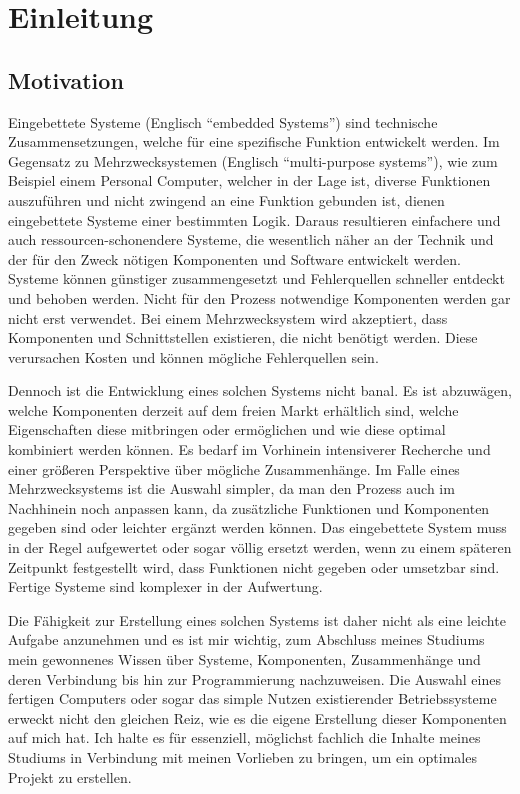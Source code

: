 \hypertarget{einleitung}{%
\chapter{Einleitung}\label{einleitung}}

\hypertarget{motivation}{%
\section{Motivation}\label{motivation}}

Eingebettete Systeme (Englisch ``embedded Systems'') sind technische
Zusammensetzungen, welche für eine spezifische Funktion entwickelt
werden. Im Gegensatz zu Mehrzwecksystemen (Englisch ``multi-purpose
systems''), wie zum Beispiel einem Personal Computer, welcher in der
Lage ist, diverse Funktionen auszuführen und nicht zwingend an eine
Funktion gebunden ist, dienen eingebettete Systeme einer bestimmten
Logik. Daraus resultieren einfachere und auch ressourcen-schonendere
Systeme, die wesentlich näher an der Technik und der für den Zweck
nötigen Komponenten und Software entwickelt werden. Systeme können
günstiger zusammengesetzt und Fehlerquellen schneller entdeckt und
behoben werden. Nicht für den Prozess notwendige Komponenten werden gar
nicht erst verwendet. Bei einem Mehrzwecksystem wird akzeptiert, dass
Komponenten und Schnittstellen existieren, die nicht benötigt werden.
Diese verursachen Kosten und können mögliche Fehlerquellen sein.

Dennoch ist die Entwicklung eines solchen Systems nicht banal. Es ist
abzuwägen, welche Komponenten derzeit auf dem freien Markt erhältlich
sind, welche Eigenschaften diese mitbringen oder ermöglichen und wie
diese optimal kombiniert werden können. Es bedarf im Vorhinein
intensiverer Recherche und einer größeren Perspektive über mögliche
Zusammenhänge. Im Falle eines Mehrzwecksystems ist die Auswahl simpler,
da man den Prozess auch im Nachhinein noch anpassen kann, da zusätzliche
Funktionen und Komponenten gegeben sind oder leichter ergänzt werden
können. Das eingebettete System muss in der Regel aufgewertet oder sogar
völlig ersetzt werden, wenn zu einem späteren Zeitpunkt festgestellt
wird, dass Funktionen nicht gegeben oder umsetzbar sind. Fertige Systeme
sind komplexer in der Aufwertung.

Die Fähigkeit zur Erstellung eines solchen Systems ist daher nicht als
eine leichte Aufgabe anzunehmen und es ist mir wichtig, zum Abschluss
meines Studiums mein gewonnenes Wissen über Systeme, Komponenten,
Zusammenhänge und deren Verbindung bis hin zur Programmierung
nachzuweisen. Die Auswahl eines fertigen Computers oder sogar das simple
Nutzen existierender Betriebssysteme erweckt nicht den gleichen Reiz,
wie es die eigene Erstellung dieser Komponenten auf mich hat. Ich halte
es für essenziell, möglichst fachlich die Inhalte meines Studiums in
Verbindung mit meinen Vorlieben zu bringen, um ein optimales Projekt zu
erstellen.

